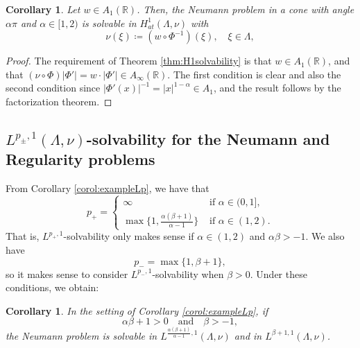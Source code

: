 \documentclass[12pt]{amsart}
\newcommand{\R}{\mathbb{R}}
\theoremstyle{plain}
\newtheorem{corollary}[theorem]{Corollary}
\theoremstyle{definition}
\numberwithin{equation}{section}
\begin{document}
\begin{corollary} Let $w\in A_1(\R)$. Then, the Neumann problem  in a cone with angle $\alpha\pi$ and $\alpha\in [1,2)$  is solvable in $H_{at}^1(\Lambda,\nu)$ with 
\begin{equation}\label{eq:exampleConformalWeight_1}
\nu(\xi)
\coloneqq 
(w\circ \Phi^{-1})(\xi),
\quad
\xi\in\Lambda,
\end{equation}
\end{corollary}
\begin{proof} The requirement of Theorem \ref{thm:H1solvability} is that $w\in A_1(\R)$, and that $(\nu\circ\Phi)|\Phi'|=w\cdot |\Phi'|\in A_{\infty}(\R)$. The first condition is clear and 
also the second condition since $ |\Phi'(x)|^{-1}=|x|^{1-\alpha}\in A_1$, and the result follows by the factorization theorem. 
\end{proof}






























\subsection{\texorpdfstring{$L^{p_{\pm},1}(\Lambda,\nu)$}{}-solvability for the Neumann and Regularity problems}\label{sec:examplesLp1}


From Corollary \ref{corol:exampleLp}, we have that 
\[
p_{+}
=
\begin{cases}
    \infty & \text{ if }\alpha\in (0,1],\\
    \max\{1,\frac{\alpha(\beta+1)}{\alpha-1}\} & \text{ if }\alpha\in (1,2).
\end{cases}
\]
That is, $L^{p_{+},1}$-solvability only makes sense if $\alpha\in (1,2)$ and $\alpha \beta>-1$. We also have
\[
p_{-}
=
\max\{1,\beta+1\},
\]
so it makes sense to consider $L^{p_{-},1}$-solvability when $\beta>0$. Under these conditions, we obtain:

\begin{corollary}\label{corol:exampleLp1}
    In the setting of Corollary \ref{corol:exampleLp}, if 
    \[
    \alpha\beta+1>0\quad\mbox{and}\quad \beta>-1,
    \]
the Neumann problem is solvable in     $L^{\frac{\alpha(\beta+1)}{\alpha-1}, 1}(\Lambda,\nu)$   and  in  $L^{\beta+1,1}(\Lambda,\nu)$. 
\end{corollary}
\end{document}
